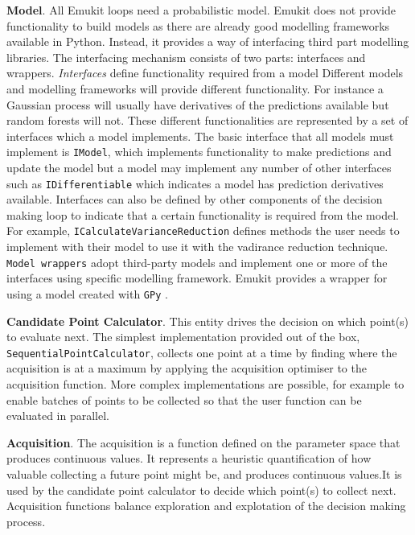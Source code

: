 \textbf{Model}. All Emukit loops need a probabilistic model. Emukit does not provide functionality to build models as there are already good modelling frameworks available in Python. Instead, it provides a way of interfacing third part modelling libraries. The interfacing mechanism consists of two parts: interfaces and wrappers. \textit{Interfaces} define functionality required from a model Different models and modelling frameworks will provide different functionality. For instance a Gaussian process will usually have derivatives of the predictions available but random forests will not. These different functionalities are represented by a set of interfaces which a model implements. The basic interface that all models must implement is \texttt{IModel}, which implements functionality to make predictions and update the model but a model may implement any number of other interfaces such as \texttt{IDifferentiable} which indicates a model has prediction derivatives available. Interfaces can also be defined by other components of the decision making loop to indicate that a certain functionality is required from the model. For example, \texttt{ICalculateVarianceReduction} defines methods the user needs to implement with their model to use it with the vadirance reduction technique. \texttt{Model wrappers} adopt third-party models and implement one or more of the interfaces using specific modelling framework. Emukit provides a wrapper for using a model created with \texttt{GPy} \cite{gpy2014}.

\textbf{Candidate Point Calculator}. This entity drives the decision on which point(s) to evaluate next. The simplest implementation provided out of the box, \texttt{SequentialPointCalculator}, collects one point at a time by finding where the acquisition is at a maximum by applying the acquisition optimiser to the acquisition function. More complex implementations are possible, for example to enable batches of points to be collected so that the user function can be evaluated in parallel.

\textbf{Acquisition}. The acquisition is a function defined on the parameter space that produces continuous values. It represents a heuristic quantification of how valuable collecting a future point might be, and produces continuous values.It is used by the candidate point calculator to decide which point(s) to collect next. Acquisition functions balance exploration and explotation of the decision making process.

